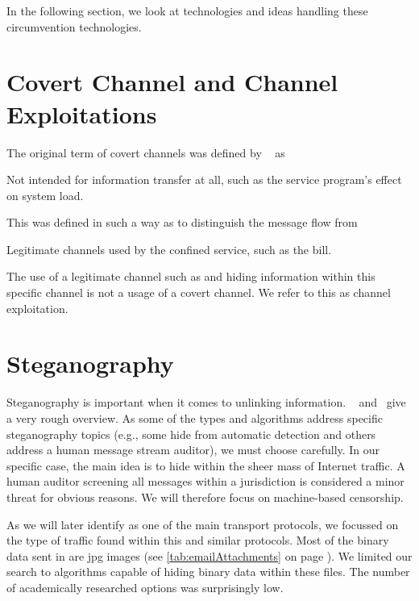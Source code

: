In the following section, we look at technologies and ideas handling these circumvention technologies.

\section{Covert Channel and Channel Exploitations}
The original term of covert channels was defined by \citeauthor{Lampson73anote}~\cite{Lampson73anote} as 

\begin{shadequote}{}
	Not intended for information transfer at all, such as the service program's effect on system load.
\end{shadequote}

This was defined in such a way as to distinguish the message flow from 

\begin{shadequote}{}
	Legitimate channels used by the confined service, such as the bill.
\end{shadequote}

The use of a legitimate channel such as  and hiding information within this specific channel is not a usage of a covert channel. We refer to this as channel exploitation.

\section{Steganography}
Steganography is important when it comes to unlinking information. ~\cite{6828087} and~\cite{subhedar2014current} give a very rough overview. As some of the types and algorithms address specific steganography topics (e.g., some hide from automatic detection and others address a human message stream auditor), we must choose carefully. In our specific case, the main idea is to hide within the sheer mass of Internet traffic. A human auditor screening all messages within a jurisdiction is considered a minor threat for obvious reasons. We will therefore focus on machine-based censorship. 

As we will later identify  as one of the main transport protocols, we focussed on the type of traffic found within this and similar protocols. Most of the binary data sent in  are jpg images (see \cref{tab:emailAttachments} on page \pageref{tab:emailAttachments}). We limited our search to algorithms capable of hiding binary data within these files. The number of academically researched options was surprisingly low.


